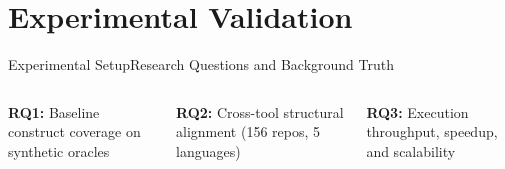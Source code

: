 \documentclass[aspectratio=169,10pt]{beamer}
\begin{document}
\section{Experimental Validation}

\begin{frame}{Experimental Setup}{Research Questions and Background Truth}
  \begin{columns}[T,onlytextwidth]
      \par\vspace{0.2em}
      {\small
      \textbf{RQ1:} Baseline construct coverage on synthetic oracles\par\vspace{0.25em}
      \textbf{RQ2:} Cross-tool structural alignment (156 repos, 5 languages)\par\vspace{0.25em}
      \textbf{RQ3:} Execution throughput, speedup, and scalability\par}
      \vspace{2.5em}


\end{columns}
\end{frame}
\end{document}
